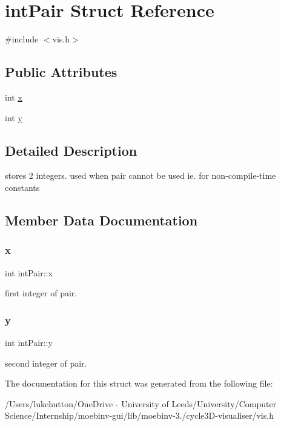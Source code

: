 \hypertarget{structint_pair}{}\section{int\+Pair Struct Reference}
\label{structint_pair}


{\ttfamily \#include $<$vis.\+h$>$}

\subsection*{Public Attributes}
\begin{DoxyCompactItemize}
\item 
int \mbox{\hyperlink{structint_pair_ab5871710162bfd837cbb99e4645e7662}{x}}
\item 
int \mbox{\hyperlink{structint_pair_a88f4c4355f1c525696998cb8e69fa285}{y}}
\end{DoxyCompactItemize}


\subsection{Detailed Description}
stores 2 integers. used when pair cannot be used ie. for non-\/compile-\/time constants 

\subsection{Member Data Documentation}
\mbox{\label{structint_pair_ab5871710162bfd837cbb99e4645e7662}} 
\subsubsection{\texorpdfstring{x}{x}}
{\footnotesize\ttfamily int int\+Pair\+::x}

first integer of pair. \mbox{\label{structint_pair_a88f4c4355f1c525696998cb8e69fa285}} 
\subsubsection{\texorpdfstring{y}{y}}
{\footnotesize\ttfamily int int\+Pair\+::y}

second integer of pair. 

The documentation for this struct was generated from the following file\+:\begin{DoxyCompactItemize}
\item 
/\+Users/lukehutton/\+One\+Drive -\/ University of Leeds/\+University/\+Computer Science/\+Internship/moebinv-\/gui/lib/moebinv-\/3./cycle3\+D-\/visualiser/vis.\+h\end{DoxyCompactItemize}
